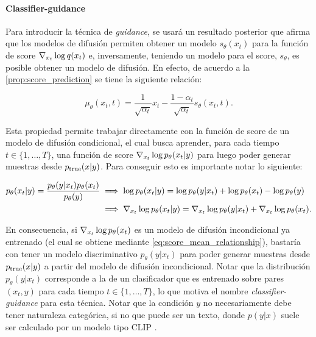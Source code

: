 \paragraph{Classifier-guidance}

Para introducir la técnica de \textit{guidance}, se usará un resultado posterior que afirma que los modelos de difusión permiten obtener un modelo $s_\theta(x_t)$ para la función de score $\nabla_{x_t} \log q(x_t)$ e, inversamente, teniendo un modelo para el score, $s_\theta$, es posible obtener un modelo de difusión. En efecto, de acuerdo a la \autoref{prop:score_prediction} se tiene la siguiente relación:

\begin{equation*}
    \label{eq:score_mean_relationship}
    \mu_\theta(x_t,t) = \frac{1}{\sqrt{\alpha_t}}x_t - \frac{1-\alpha_t}{\sqrt{\alpha_t}}s_\theta(x_t,t).
\end{equation*}

Esta propiedad permite trabajar directamente con la función de score de un modelo de difusión condicional, el cual busca aprender, para cada tiempo $t\in\{1,\ldots,T\}$, una función de score $\nabla_{x_t} \log p_\theta(x_t|y)$ para luego poder generar muestras desde $p_{\operatorname{true}}(x|y)$. Para conseguir esto es importante notar lo siguiente:

\begin{align}
    p_\theta(x_t|y) = \frac{p_\theta(y|x_t)p_\theta(x_t)}{p_\theta(y)} & \implies \log p_\theta(x_t|y) = \log p_\theta(y|x_t) + \log p_\theta(x_t) - \log p_\theta(y)\nonumber                             \\
                                                                       & \implies \nabla_{x_t} \log p_\theta(x_t|y) = \nabla_{x_t} \log p_\theta(y|x_t) + \nabla_{x_t} \log p_\theta(x_t)\label{eq:classifier_guidance} .
\end{align}

En consecuencia, si $\nabla_{x_t} \log p_\theta(x_t)$ es un modelo de difusión incondicional ya entrenado (el cual se obtiene mediante \eqref{eq:score_mean_relationship}), bastaría con tener un modelo discriminativo $p_\theta(y|x_t)$ para poder generar muestras desde $p_{\operatorname{true}}(x|y)$ a partir del modelo de difusión incondicional. Notar que la distribución $p_\theta(y|x_t)$ corresponde a la de un clasificador que es entrenado sobre pares $(x_t,y)$ para cada tiempo $t\in\{1,\ldots,T\}$, lo que motiva el nombre \textit{classifier-guidance} para esta técnica. Notar que la condición $y$ no necesariamente debe tener naturaleza categórica, si no que puede ser un texto, donde $p(y|x)$ suele ser calculado por un modelo tipo CLIP \cite{radford2021learningtransferablevisualmodels}.

